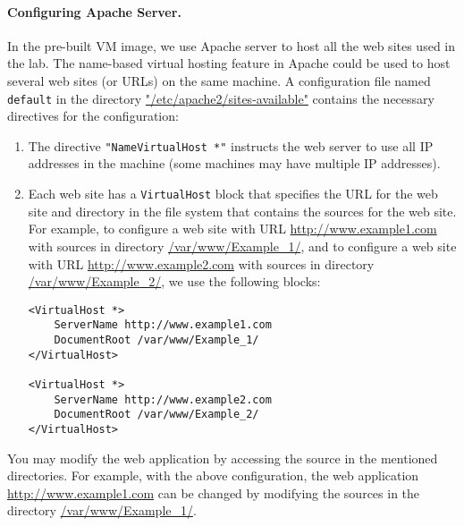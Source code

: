 

\paragraph{Configuring Apache Server.}
In the pre-built VM image, we use Apache server to host all the web
sites used in the lab. The name-based virtual hosting feature in
Apache could be used to host several web sites (or URLs) on the same
machine. A configuration file named {\tt default} in the directory
\url{"/etc/apache2/sites-available"} contains the necessary directives for the
configuration:

\begin{enumerate}
\item The directive {\tt "NameVirtualHost *"} instructs the web
  server to use all IP addresses in the machine (some machines
  may have multiple IP addresses).

\item Each web site has a {\tt VirtualHost} block that specifies the
  URL for the web site and directory in the file system that contains
  the sources for the web site. For example, to configure a web site
  with URL \url{http://www.example1.com} with sources in directory
  \url{/var/www/Example_1/}, and to configure a web site
  with URL \url{http://www.example2.com} with sources in directory
  \url{/var/www/Example_2/},
  we use the following blocks:

\begin{Verbatim}[frame=single]
<VirtualHost *>
    ServerName http://www.example1.com
    DocumentRoot /var/www/Example_1/
</VirtualHost>

<VirtualHost *>
    ServerName http://www.example2.com
    DocumentRoot /var/www/Example_2/
</VirtualHost>
\end{Verbatim}

\end{enumerate}

You may modify the web application by accessing the source in the
mentioned directories. For example, with the above configuration,
the web application \url{http://www.example1.com} can be changed by modifying
the sources in the directory \url{/var/www/Example_1/}.


